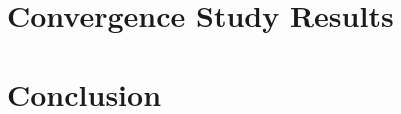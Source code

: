 \documentclass[note]{TechNote}
\begin{document}
\section{Convergence Study Results}

\section{Conclusion}


% 
% 

\closing
\caution
\end{document}
